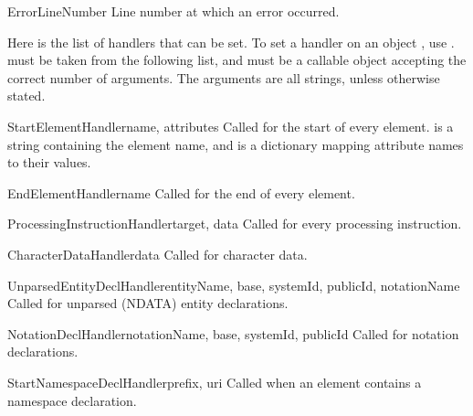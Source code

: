 \begin{memberdesc}[xmlparser]{ErrorLineNumber}
Line number at which an error occurred.
\end{memberdesc}

Here is the list of handlers that can be set.  To set a handler on an
 object , use
.   must
be taken from the following list, and  must be a callable
object accepting the correct number of arguments.  The arguments are
all strings, unless otherwise stated.

\begin{methoddesc}[xmlparser]{StartElementHandler}{name, attributes}
Called for the start of every element.   is a string
containing the element name, and  is a dictionary
mapping attribute names to their values.
\end{methoddesc}

\begin{methoddesc}[xmlparser]{EndElementHandler}{name}
Called for the end of every element.
\end{methoddesc}

\begin{methoddesc}[xmlparser]{ProcessingInstructionHandler}{target, data}
Called for every processing instruction.  
\end{methoddesc}

\begin{methoddesc}[xmlparser]{CharacterDataHandler}{data}
Called for character data.  
\end{methoddesc}

\begin{methoddesc}[xmlparser]{UnparsedEntityDeclHandler}{entityName, base,
                                                         systemId, publicId,
                                                         notationName}
Called for unparsed (NDATA) entity declarations.
\end{methoddesc}

\begin{methoddesc}[xmlparser]{NotationDeclHandler}{notationName, base,
                                                   systemId, publicId}
Called for notation declarations.
\end{methoddesc}

\begin{methoddesc}[xmlparser]{StartNamespaceDeclHandler}{prefix, uri}
Called when an element contains a namespace declaration.
\end{methoddesc}

